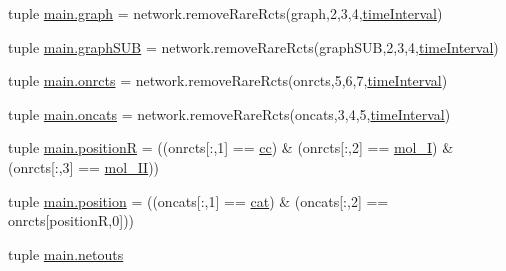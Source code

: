\begin{DoxyCompactItemize}
tuple \hyperlink{a00153_a4cfdc01ecc5ad260a4f30c9353e3d856}{main.\+graph} = network.\+remove\+Rare\+Rcts(graph,2,3,4,\hyperlink{a00028_a430673c9821c17e4bf93cd42f59e00bb}{time\+Interval})
\item 
tuple \hyperlink{a00153_ab96de87bc8cbe59221256af996bdc43e}{main.\+graph\+S\+U\+B} = network.\+remove\+Rare\+Rcts(graph\+S\+U\+B,2,3,4,\hyperlink{a00028_a430673c9821c17e4bf93cd42f59e00bb}{time\+Interval})
\item 
tuple \hyperlink{a00153_ab26ffc3eda5d201a779d705813b06348}{main.\+onrcts} = network.\+remove\+Rare\+Rcts(onrcts,5,6,7,\hyperlink{a00028_a430673c9821c17e4bf93cd42f59e00bb}{time\+Interval})
\item 
tuple \hyperlink{a00153_ab4d380bc4bfcb970acc39ddf18a73972}{main.\+oncats} = network.\+remove\+Rare\+Rcts(oncats,3,4,5,\hyperlink{a00028_a430673c9821c17e4bf93cd42f59e00bb}{time\+Interval})
\item 
tuple \hyperlink{a00153_adbbdc0f6ad0f08400b3e492f7a807a6b}{main.\+position\+R} = ((onrcts\mbox{[}\+:,1\mbox{]} == \hyperlink{a00028_afb5980388a6e55ca55437b53cdaf528a}{cc}) \& (onrcts\mbox{[}\+:,2\mbox{]} == \hyperlink{a00028_ab346189eef5359a07ba32144ddcd4465}{mol\+\_\+\+I}) \& (onrcts\mbox{[}\+:,3\mbox{]} == \hyperlink{a00028_a4d2c086887289f8900b38ffa56854da3}{mol\+\_\+\+I\+I}))
\item 
tuple \hyperlink{a00153_ac67c60df3cc9afae7e4888d2b48b846d}{main.\+position} = ((oncats\mbox{[}\+:,1\mbox{]} == \hyperlink{a00028_a7073f71a43389f3032e69b1fffc2551a}{cat}) \& (oncats\mbox{[}\+:,2\mbox{]} == onrcts\mbox{[}position\+R,0\mbox{]}))
\item 
tuple \hyperlink{a00153_a02c2194d4e56d3d8c6d2c204a8017e3a}{main.\+netouts}
\end{DoxyCompactItemize}
